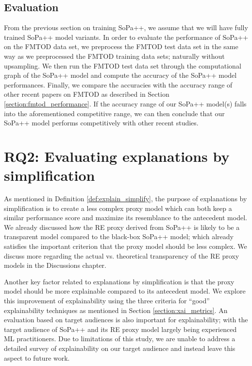 \subsection{Evaluation}

From the previous section on training SoPa++, we assume that we will have fully
trained SoPa++ model variants. In order to evaluate the performance of SoPa++ on
the FMTOD data set, we preprocess the FMTOD test data set in the same way as we
preprocessed the FMTOD training data sets; naturally without upsampling. We then
run the FMTOD test data set through the computational graph of the SoPa++ model
and compute the accuracy of the SoPa++ model performances. Finally, we compare
the accuracies with the accuracy range of other recent papers on FMTOD as
described in Section \ref{section:fmtod_performance}. If the accuracy range of
our SoPa++ model(s) falls into the aforementioned competitive range, we can then
conclude that our SoPa++ model performs competitively with other recent studies.

\section{RQ2: Evaluating explanations by simplification}

As mentioned in Definition \ref{def:explain_simplify}, the purpose of
explanations by simplification is to create a less complex proxy model which can
both keep a similar performance score and maximize its resemblance to the
antecedent model. We already discussed how the RE proxy derived from SoPa++ is
likely to be a transparent model compared to the black-box SoPa++ model; which
already satisfies the important criterion that the proxy model should be less
complex. We discuss more regarding the actual vs. theoretical transparency of
the RE proxy models in the Discussions chapter.

Another key factor related to explanations by simplification is that the proxy
model should be more explainable compared to its antecedent model. We explore
this improvement of explainability using the three criteria for ``good''
explainability techniques as mentioned in Section \ref{section:xai_metrics}.
An evaluation based on target audiences is also important for explainability;
with the target audience of SoPa++ and its RE proxy model largely being
experienced ML practitioners. Due to limitations of this study, we are unable to
address a detailed survey of explainability on our target audience and instead
leave this aspect to future work.

